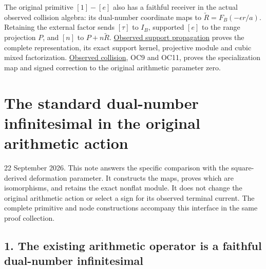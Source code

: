 \documentclass[
]{article}
\begin{document}
The original primitive \([1]-[e]\) also has a faithful receiver in the
actual observed collision algebra: its dual-number coordinate maps to
\(\widetilde R=F_B(-\epsilon r/a)\). Retaining the external factor sends
\([\tau]\) to \(I_B\), supported \([e]\) to the range projection \(P\),
and \([n]\) to \(P+n\widetilde R\).
\href{https://github.com/KokunoYumeto/zeta-function-research-reader/blob/c9df443d9e1df000dfbb083943f97197e746eb08/workbenches/splitzero-tandem/branches/identity-absorber-square/OBSERVED_SUPPORT_PROPAGATION.md}{Observed
support propagation} proves the complete representation, its exact
support kernel, projective module and cubic mixed factorization.
\href{https://github.com/KokunoYumeto/zeta-function-research-reader/blob/c9df443d9e1df000dfbb083943f97197e746eb08/workbenches/splitzero-tandem/branches/identity-absorber-square/OBSERVED_COLLISION.md}{Observed
collision}, OC9 and OC11, proves the specialization map and signed
correction to the original arithmetic parameter zero.

\section{The standard dual-number infinitesimal in the original
arithmetic
action}\label{the-standard-dual-number-infinitesimal-in-the-original-arithmetic-action}

22 September 2026. This note answers the specific comparison with the
square-derived deformation parameter. It constructs the maps, proves
which are isomorphisms, and retains the exact nonflat module. It does
not change the original arithmetic action or select a sign for its
observed terminal current. The complete primitive and node constructions
accompany this interface in the same proof collection.

\subsection{1. The existing arithmetic operator is a faithful
dual-number
infinitesimal}\label{the-existing-arithmetic-operator-is-a-faithful-dual-number-infinitesimal}
\end{document}
